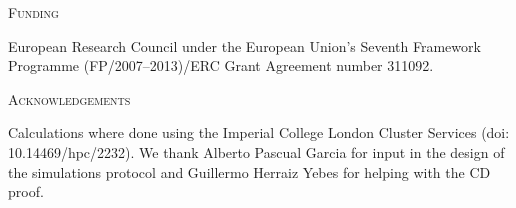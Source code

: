 \documentclass[12pt,letterpaper]{article}
\renewcommand{\section}[1]{%
\bigskip
\begin{center}
\begin{Large}
\normalfont\scshape #1
\medskip
\end{Large}
\end{center}}
\begin{document}
\section{Funding}
European Research Council under the European Union’s Seventh Framework Programme (FP/2007–2013)/ERC Grant Agreement number 311092.


\section{Acknowledgements}
Calculations where done using the Imperial College London Cluster Services (doi: 10.14469/hpc/2232).
We thank Alberto Pascual Garcia for input in the design of the simulations protocol and Guillermo Herraiz Yebes for helping with the CD proof.






\end{document}
